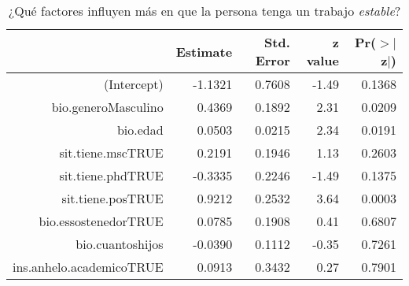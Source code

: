 \begin{table}[ht]
\centering
\begin{tabular}{rrrrr}
  \hline
 & Estimate & Std. Error & z value & Pr($>$$|$z$|$) \\ 
  \hline
(Intercept) & -1.1321 & 0.7608 & -1.49 & 0.1368 \\ 
  bio.generoMasculino & 0.4369 & 0.1892 & 2.31 & 0.0209 \\ 
  bio.edad & 0.0503 & 0.0215 & 2.34 & 0.0191 \\ 
  sit.tiene.mscTRUE & 0.2191 & 0.1946 & 1.13 & 0.2603 \\ 
  sit.tiene.phdTRUE & -0.3335 & 0.2246 & -1.49 & 0.1375 \\ 
  sit.tiene.posTRUE & 0.9212 & 0.2532 & 3.64 & 0.0003 \\ 
  bio.essostenedorTRUE & 0.0785 & 0.1908 & 0.41 & 0.6807 \\ 
  bio.cuantoshijos & -0.0390 & 0.1112 & -0.35 & 0.7261 \\ 
  ins.anhelo.academicoTRUE & 0.0913 & 0.3432 & 0.27 & 0.7901 \\ 
   \hline
\end{tabular}
\caption{¿Qué factores influyen más en que la persona tenga un trabajo \emph{estable}?} 
\label{tab:reg3}
\end{table}
